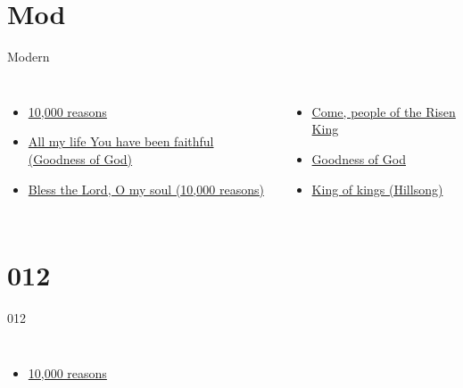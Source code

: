 \documentclass{beamer}
\begin{document}
\section{Mod}

\begin{frame}{Modern}
\begin{columns}
    \begin{itemize}
    \item \hyperlink{10,000 reasons['Bless the Lord, O my soul']C}{10,000 reasons }
    \item \hyperlink{Goodness of God['All my life You have been faithful']1}{All my life You have been faithful (Goodness of God)}
    \item \hyperlink{10,000 reasons['Bless the Lord, O my soul']C}{Bless the Lord, O my soul (10,000 reasons)}
\end{itemize}
    \begin{itemize}
    \item \hyperlink{Come, people of the Risen King[]1}{Come, people of the Risen King }
    \item \hyperlink{Goodness of God['All my life You have been faithful']1}{Goodness of God }
    \item \hyperlink{King of kings[](Hillsong)1}{King of kings (Hillsong)}
\end{itemize}


\end{columns}

\end{frame}

\section{012}

\begin{frame}{012}
\begin{columns}
    \begin{itemize}
    \item \hyperlink{10,000 reasons['Bless the Lord, O my soul']C}{10,000 reasons }
\end{itemize}


\end{columns}

\end{frame}
\end{document}
